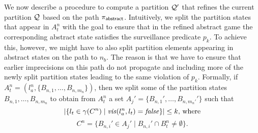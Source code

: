We now describe a procedure to compute a partition $\mathcal{Q}'$ that refines the current partition $\mathcal{Q}$ based on the path $\pi_{\mathsf{abstract}}$. Intuitively, we split the partition states that appear in $A_t^n$ with the goal to ensure that in the refined abstract game the corresponding abstract state satisfies the surveillance predicate $p_k$. To achieve this, however, we might have to also split partition elements appearing in abstract states on the path to $n_b$. The reason is that we have to ensure that earlier imprecisions on this path do not propagate and including more of the newly split partition states leading to the same violation of $p_k$.
Formally, if $A_t^n = (l_a^n,\{B_{n,1},\ldots,B_{n,m_n}\})$, then we split some of the partition states $B_{n,1},\ldots,B_{n,m_n}$ to obtain from $A_t^n$ a set $A_j' = \{B_{n,1}',\ldots,B_{n,m_n'}'\}$ such that
\[|\{l_t \in \gamma(C^n) \mid \mathit{vis}(l_a^n,l_t) = \mathit{false}\}| \leq k \text{, where}\] 
\[C^n = \{B_{n,i}' \in A_j' \mid B_{n,i}' \cap B_t^n \neq \emptyset\}.\]
